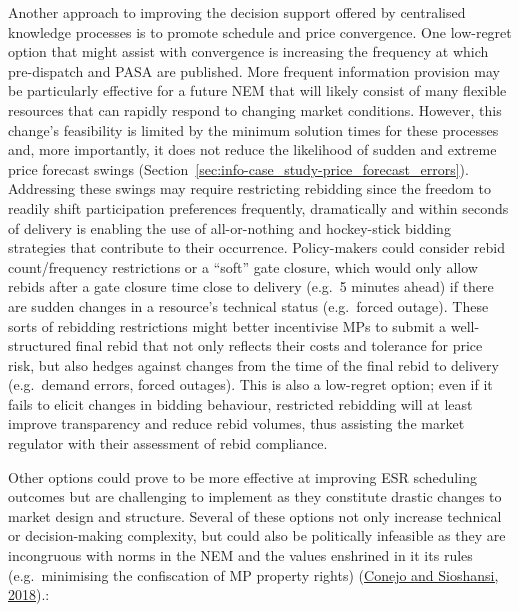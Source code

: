 \documentclass[12pt,a4paper,]{report}
\begin{document}
Another approach to improving the decision support offered by
centralised knowledge processes is to promote schedule and price
convergence. One low-regret option that might assist with convergence is
increasing the frequency at which pre-dispatch and PASA are published.
More frequent information provision may be particularly effective for a
future NEM that will likely consist of many flexible resources that can
rapidly respond to changing market conditions. However, this change's
feasibility is limited by the minimum solution times for these processes
and, more importantly, it does not reduce the likelihood of sudden and
extreme price forecast swings
(Section~\ref{sec:info-case_study-price_forecast_errors}). Addressing
these swings may require restricting rebidding since the freedom to
readily shift participation preferences frequently, dramatically and
within seconds of delivery is enabling the use of all-or-nothing and
hockey-stick bidding strategies that contribute to their occurrence.
Policy-makers could consider rebid count/frequency restrictions or a
``soft'' gate closure, which would only allow rebids after a gate
closure time close to delivery (e.g.~5 minutes ahead) if there are
sudden changes in a resource's technical status (e.g.~forced outage).
These sorts of rebidding restrictions might better incentivise MPs to
submit a well-structured final rebid that not only reflects their costs
and tolerance for price risk, but also hedges against changes from the
time of the final rebid to delivery (e.g.~demand errors, forced
outages). This is also a low-regret option; even if it fails to elicit
changes in bidding behaviour, restricted rebidding will at least improve
transparency and reduce rebid volumes, thus assisting the market
regulator with their assessment of rebid compliance.

Other options could prove to be more effective at improving ESR
scheduling outcomes but are challenging to implement as they constitute
drastic changes to market design and structure. Several of these options
not only increase technical or decision-making complexity, but could
also be politically infeasible as they are incongruous with norms in the
NEM and the values enshrined in it its rules (e.g.~minimising the
confiscation of MP property rights)
(\protect\hyperlink{ref-conejoRethinkingRestructuredElectricity2018}{Conejo
and Sioshansi, 2018}).:
\end{document}
